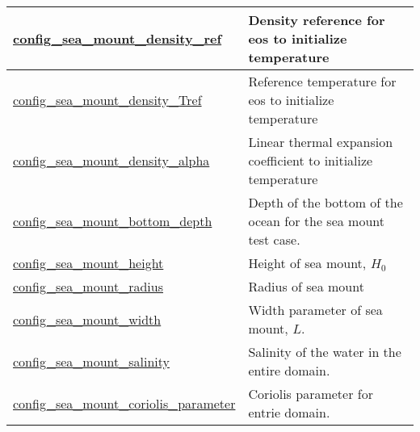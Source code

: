 {\begin{center}
\begin{longtable}{| p{2.0in} || p{4.0in} |}
    \hline
    \hyperref[subsec:nm_sec_config_sea_mount_density_ref]{config\_sea\_mount\_density\_ref} & Density reference for eos to initialize temperature \\
    \hline
    \hyperref[subsec:nm_sec_config_sea_mount_density_Tref]{config\_sea\_mount\_density\_\-Tref} & Reference temperature for eos to initialize temperature \\
    \hline
    \hyperref[subsec:nm_sec_config_sea_mount_density_alpha]{config\_sea\_mount\_density\_\-alpha} & Linear thermal expansion coefficient to initialize temperature \\
    \hline
    \hyperref[subsec:nm_sec_config_sea_mount_bottom_depth]{config\_sea\_mount\_bottom\_\-depth} & Depth of the bottom of the ocean for the sea mount test case. \\
    \hline
    \hyperref[subsec:nm_sec_config_sea_mount_height]{config\_sea\_mount\_height} & Height of sea mount, $H_0$ \\
    \hline
    \hyperref[subsec:nm_sec_config_sea_mount_radius]{config\_sea\_mount\_radius} & Radius of sea mount \\
    \hline
    \hyperref[subsec:nm_sec_config_sea_mount_width]{config\_sea\_mount\_width} & Width parameter of sea mount, $L$. \\
    \hline
    \hyperref[subsec:nm_sec_config_sea_mount_salinity]{config\_sea\_mount\_salinity} & Salinity of the water in the entire domain. \\
    \hline
    \hyperref[subsec:nm_sec_config_sea_mount_coriolis_parameter]{config\_sea\_mount\_coriolis\_\-parameter} & Coriolis parameter for entrie domain. \\
    \hline
\end{longtable}
\end{center}
}
